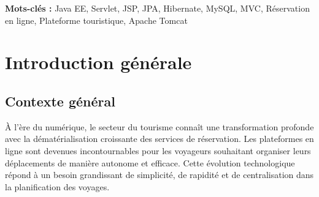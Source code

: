 \documentclass[12pt,a4paper]{report}
\begin{document}
\noindent\textbf{Mots-clés :} Java EE, Servlet, JSP, JPA, Hibernate, MySQL, MVC, Réservation en ligne, Plateforme touristique, Apache Tomcat

\clearpage



\tableofcontents
\clearpage

\listoffigures
\clearpage

\listoftables
\clearpage

%

% 
% 
% 
% 
% 
% 



\chapter*{Introduction générale}

\section*{Contexte général}

À l'ère du numérique, le secteur du tourisme connaît une transformation profonde avec la dématérialisation croissante des services de réservation. Les plateformes en ligne sont devenues incontournables pour les voyageurs souhaitant organiser leurs déplacements de manière autonome et efficace. Cette évolution technologique répond à un besoin grandissant de simplicité, de rapidité et de centralisation dans la planification des voyages.
\end{document}
